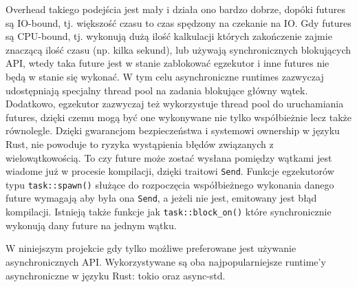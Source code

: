 Overhead takiego podejścia jest mały i działa ono bardzo dobrze, dopóki futures są IO-bound, tj.
większość czasu to czas spędzony na czekanie na IO. Gdy futures są CPU-bound, tj. wykonują dużą
ilość kalkulacji których zakończenie zajmie znaczącą ilość czasu (np. kilka sekund), lub używają
synchronicznych blokujących API, wtedy taka future jest w stanie zablokować egzekutor i inne futures
nie będą w stanie się wykonać. W tym celu asynchroniczne runtimes zazwyczaj udostępniają specjalny
thread pool na zadania blokujące główny wątek. Dodatkowo, egzekutor zazwyczaj też wykorzystuje
thread pool do uruchamiania futures, dzięki czemu mogą być one wykonywane nie tylko współbieżnie lecz
także równolegle. Dzięki gwarancjom bezpieczeństwa i systemowi ownership w języku Rust, nie powoduje
to ryzyka wystąpienia błędów związanych z wielowątkowością. To czy future może zostać wysłana
pomiędzy wątkami jest wiadome już w procesie kompilacji, dzięki traitowi \verb|Send|. Funkcje
egzekutorów typu \verb|task::spawn()| służące do rozpoczęcia współbieżnego wykonania danego future
wymagają aby była ona \verb|Send|, a jeżeli nie jest, emitowany jest błąd kompilacji. Istnieją także
funkcje jak \verb|task::block_on()| które synchronicznie wykonują dany future na jednym wątku.

W niniejszym projekcie gdy tylko możliwe preferowane jest używanie asynchronicznych API.
Wykorzystywane są oba najpopularniejsze runtime'y asynchroniczne w języku Rust: tokio oraz
async-std.

